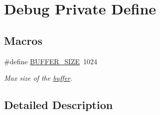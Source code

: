 \hypertarget{group___debug___private___define}{}\section{Debug Private Define}
\label{group___debug___private___define}
\subsection*{Macros}
\begin{DoxyCompactItemize}
\item 
\#define \hyperlink{group___debug___private___define_ga6b20d41d6252e9871430c242cb1a56e7}{B\+U\+F\+F\+E\+R\+\_\+\+S\+I\+ZE}~1024\hypertarget{group___debug___private___define_ga6b20d41d6252e9871430c242cb1a56e7}{}\label{group___debug___private___define_ga6b20d41d6252e9871430c242cb1a56e7}

\begin{DoxyCompactList}\small\item\em Max size of the \hyperlink{group___debug___private___variables_gacab2203504e72e5e674d3174e0bd7d5e}{buffer}. \end{DoxyCompactList}\end{DoxyCompactItemize}


\subsection{Detailed Description}

